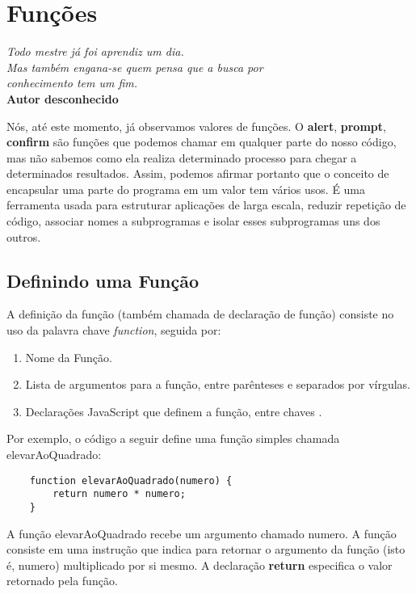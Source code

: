 \chapter{Funções}

\begin{flushright}
  \textit{
    Todo mestre já foi aprendiz um dia. \\ Mas também engana-se quem pensa que a busca por \\  conhecimento tem um fim. 
  } \\
  
  \textbf{Autor desconhecido}
\end{flushright}

Nós, até este momento, já observamos valores de funções. O \textbf{alert}, \textbf{prompt}, \textbf{confirm} são funções que podemos chamar em qualquer parte do nosso código, mas não sabemos como ela realiza determinado processo para chegar a determinados resultados. Assim, podemos afirmar portanto que o conceito de encapsular uma parte do programa em um valor tem vários usos. É uma ferramenta usada para estruturar aplicações de larga escala, reduzir repetição de código, associar nomes a subprogramas e isolar esses subprogramas uns dos outros.

\section{Definindo uma Função}

A definição da função (também chamada de declaração de função) consiste no uso da palavra chave \textit{function}, seguida por:

\begin{enumerate}
	\item Nome da Função.
	\item Lista de argumentos para a função, entre parênteses e separados por vírgulas.
	\item Declarações JavaScript que definem a função, entre chaves { }.
\end{enumerate}

Por exemplo, o código a seguir define uma função simples chamada elevarAoQuadrado:

\begin{lstlisting}
	function elevarAoQuadrado(numero) { 
		return numero * numero; 
	}
\end{lstlisting}

A função elevarAoQuadrado recebe um argumento chamado numero. A função consiste em uma instrução que indica para retornar o argumento da função (isto é, numero) multiplicado por si mesmo. A declaração \textbf{return} especifica o valor retornado pela função.

